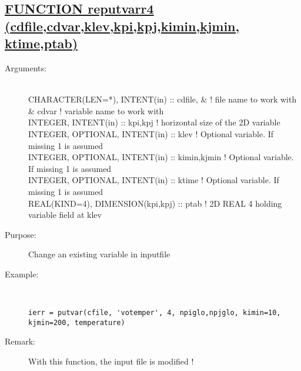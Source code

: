 \documentclass[a4paper,11pt]{article}
\begin{document}
\subsection*{\underline{FUNCTION  reputvarr4 (cdfile,cdvar,klev,kpi,kpj,kimin,kjmin, ktime,ptab) }}
\begin{description}
\item[Arguments:] \ \\
    CHARACTER(LEN=*), INTENT(in) :: cdfile,     \&   ! file name to work with \\
         \&                          cdvar           ! variable name to work with \\
    INTEGER, INTENT(in) :: kpi,kpj                  ! horizontal size of the 2D variable \\
    INTEGER, OPTIONAL, INTENT(in) :: klev           ! Optional variable. If missing 1 is assumed \\
    INTEGER, OPTIONAL, INTENT(in) :: kimin,kjmin    ! Optional variable. If missing 1 is assumed \\
    INTEGER, OPTIONAL, INTENT(in) :: ktime          ! Optional variable. If missing 1 is assumed \\
    REAL(KIND=4), DIMENSION(kpi,kpj) ::  ptab     ! 2D REAL 4 holding variable field at klev 

\item[Purpose:]  Change an existing variable in inputfile
\item[Example:]\ \\
\begin{verbatim}
ierr = putvar(cfile, 'votemper', 4, npiglo,npjglo, kimin=10, kjmin=200, temperature)
\end{verbatim}
\item[Remark:] With this function, the input file is modified !
\end{description}

\newpage
\end{document}
